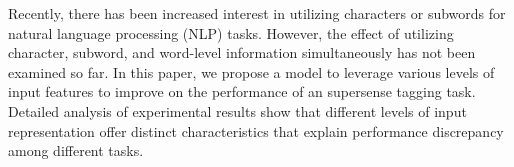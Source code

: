 Recently, there has been increased interest in utilizing characters or subwords for natural language processing (NLP) tasks. However, the effect of utilizing character, subword, and word-level information simultaneously has not been examined so far. In this paper, we propose a model to leverage various levels of input features to improve on the performance of an supersense tagging task. Detailed analysis of experimental results show that different levels of input representation offer distinct characteristics that explain performance discrepancy among different tasks.
